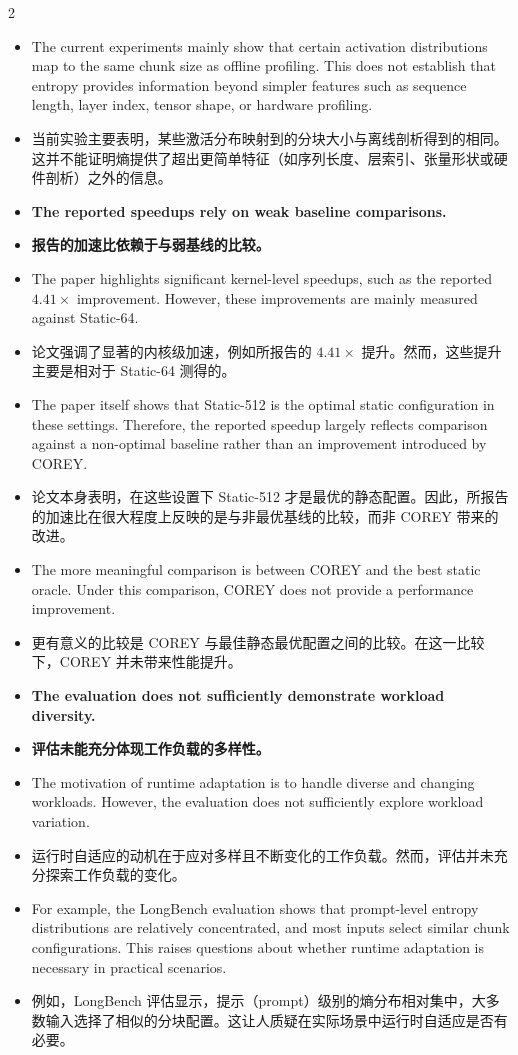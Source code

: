 \documentclass[10pt,a4paper]{article}
\newcommand{\Pair}[2]{#1\par\switchcolumn #2\par\switchcolumn*}
\newcommand{\PItem}[3]{\Pair{\begin{itemize}[label={#1}]\item #2\end{itemize}}%
                            {\begin{itemize}[label={#1}]\item #3\end{itemize}}}
\newcommand{\PCont}[2]{\Pair{\begin{itemize}[label={}]\item #1\end{itemize}}%
                            {\begin{itemize}[label={}]\item #2\end{itemize}}}
\begin{document}
\begin{paracol}{2}
\PCont{The current experiments mainly show that certain activation distributions map
to the same chunk size as offline profiling. This does not establish that entropy
provides information beyond simpler features such as sequence length, layer index,
tensor shape, or hardware profiling.}
{当前实验主要表明，某些激活分布映射到的分块大小与离线剖析得到的相同。这并不能证明熵提供了超出更简单特征（如序列长度、层索引、张量形状或硬件剖析）之外的信息。}

\PItem{3.}{\textbf{The reported speedups rely on weak baseline comparisons.}}
{\textbf{报告的加速比依赖于与弱基线的比较。}}

\PCont{The paper highlights significant kernel-level speedups, such as the reported
$4.41\times$ improvement. However, these improvements are mainly measured against
Static-64.}
{论文强调了显著的内核级加速，例如所报告的 $4.41\times$ 提升。然而，这些提升主要是相对于 Static-64 测得的。}

\PCont{The paper itself shows that Static-512 is the optimal static configuration in
these settings. Therefore, the reported speedup largely reflects comparison against
a non-optimal baseline rather than an improvement introduced by COREY.}
{论文本身表明，在这些设置下 Static-512 才是最优的静态配置。因此，所报告的加速比在很大程度上反映的是与非最优基线的比较，而非 COREY 带来的改进。}

\PCont{The more meaningful comparison is between COREY and the best static oracle.
Under this comparison, COREY does not provide a performance improvement.}
{更有意义的比较是 COREY 与最佳静态最优配置之间的比较。在这一比较下，COREY 并未带来性能提升。}

\PItem{4.}{\textbf{The evaluation does not sufficiently demonstrate workload
diversity.}}
{\textbf{评估未能充分体现工作负载的多样性。}}

\PCont{The motivation of runtime adaptation is to handle diverse and changing
workloads. However, the evaluation does not sufficiently explore workload
variation.}
{运行时自适应的动机在于应对多样且不断变化的工作负载。然而，评估并未充分探索工作负载的变化。}

\PCont{For example, the LongBench evaluation shows that prompt-level entropy
distributions are relatively concentrated, and most inputs select similar chunk
configurations. This raises questions about whether runtime adaptation is necessary
in practical scenarios.}
{例如，LongBench 评估显示，提示（prompt）级别的熵分布相对集中，大多数输入选择了相似的分块配置。这让人质疑在实际场景中运行时自适应是否有必要。}


\end{paracol}
\end{document}
